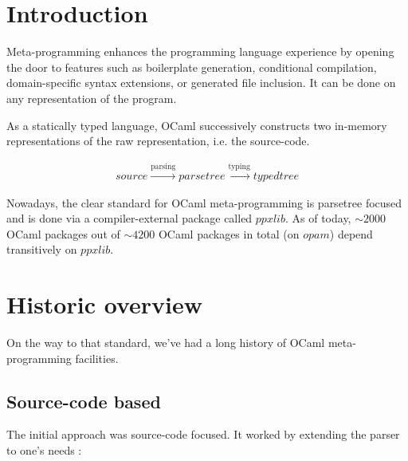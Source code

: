\documentclass[10pt, a4paper, twocolumn]{article}
\begin{document}

\twocolumn[
  \begin{@twocolumnfalse}
    \maketitle
    \begin{abstract}
      \abstractText
      \newline
      \newline
    \end{abstract}
  \end{@twocolumnfalse}
]


\section{Introduction}
Meta-programming enhances the programming language experience by opening the door to features such as boilerplate generation, conditional compilation, domain-specific syntax extensions, or generated file inclusion. It can be done on any representation of the program.

As a statically typed language, OCaml successively constructs two in-memory representations of the raw representation, i.e. the source-code.

\begin{align*}
source \xrightarrow{\text{parsing}} parsetree \xrightarrow{\text{typing}} typedtree
\end{align*}

Nowadays, the clear standard for OCaml meta-programming is parsetree focused and is done via a compiler-external package called $ppxlib$. As of today, $\sim2000$ OCaml packages out of $\sim4200$ OCaml packages in total (on $opam$) depend transitively on $ppxlib$.

\section{Historic overview}

On the way to that standard, we've had a long history of OCaml meta-programming facilities.


\subsection{Source-code based}

The initial approach was source-code focused. It worked by extending the parser to one's needs \cite{camlp4}:
\end{document}
